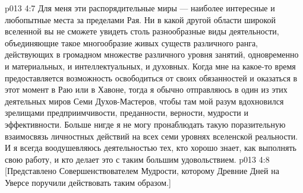 \vs p013 4:7 Для меня эти распорядительные миры --- наиболее интересные и любопытные места за пределами Рая. Ни в какой другой области широкой вселенной вы не сможете увидеть столь разнообразные виды деятельности, объединяющие такое многообразие живых существ различного ранга, действующих в громадном множестве различного уровня занятий, одновременно и материальных, и интеллектуальных, и духовных. Когда мне на какое\hyp{}то время предоставляется возможность освободиться от своих обязанностей и оказаться в этот момент в Раю или в Хавоне, тогда я обычно отправляюсь в один из этих деятельных миров Семи Духов\hyp{}Мастеров, чтобы там мой разум вдохновился зрелищами предприимчивости, преданности, верности, мудрости и эффективности. Больше нигде я не могу пронаблюдать такую поразительную взаимосвязь личностных действий на всех семи уровнях вселенской реальности. И я всегда воодушевляюсь деятельностью тех, кто хорошо знает, как выполнять свою работу, и кто делает это с таким большим удовольствием.
\vsetoff
\vs p013 4:8 [Представлено Совершенствователем Мудрости, которому Древние Дней на Уверсе поручили действовать таким образом.]
